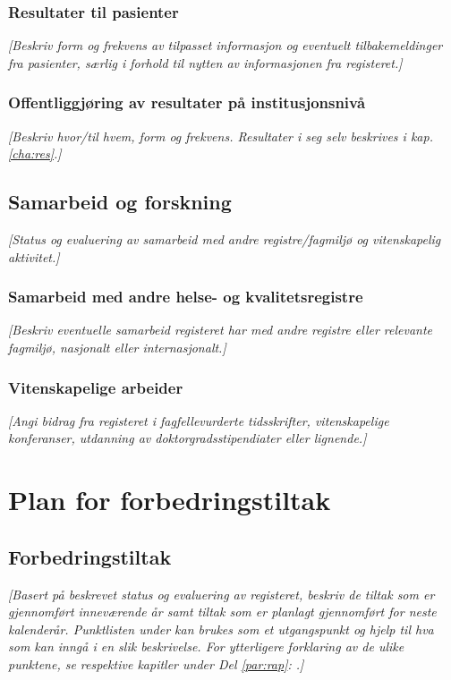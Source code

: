 \documentclass[norsk, a4paper, twocolumn]{report}
\newcommand{\guide}[1] {
	\textit{[\textcolor{guidegray}{#1}]}
	}
\begin{document}
\section{Resultater til pasienter}\label{sec:respas}
\guide{Beskriv form og frekvens av tilpasset informasjon og eventuelt
tilbakemeldinger fra pasienter, særlig i forhold til nytten av informasjonen
fra registeret.}

\section{Offentliggjøring av resultater på institusjonsnivå}\label{sec:off}
\guide{Beskriv hvor/til hvem, form og frekvens. Resultater i seg selv beskrives i kap. \ref{cha:res}.}




\chapter{Samarbeid og forskning}\label{cha:for}
\guide{Status og evaluering av samarbeid med andre registre/fagmiljø og  vitenskapelig aktivitet.}

\section{Samarbeid med andre helse- og kvalitetsregistre}\label{sec:samfag}
\guide{Beskriv eventuelle samarbeid registeret har med andre registre eller relevante fagmiljø, nasjonalt eller internasjonalt.}

\section{Vitenskapelige arbeider}\label{sec:vitarb}
\guide{Angi bidrag fra registeret i fagfellevurderte tidsskrifter,
vitenskapelige konferanser, utdanning av doktorgradsstipendiater eller
lignende.}




\onecolumn


\part{Plan for forbedringstiltak}\label{par:for}


\chapter{Forbedringstiltak}
\guide{Basert på beskrevet status og evaluering av registeret, beskriv de
tiltak som er gjennomført inneværende år samt tiltak som er planlagt gjennomført  for neste kalenderår.
Punktlisten under kan brukes som et utgangspunkt og hjelp til hva som kan
inngå i en slik beskrivelse. For ytterligere forklaring av de ulike punktene,
se respektive kapitler under Del \ref{par:rap}: \nameref{par:rap}.}
\end{document}
